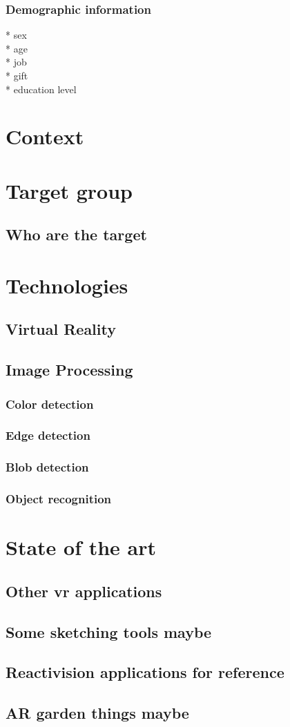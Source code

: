 		\subsubsection{Demographic information}
		* sex\\
		* age\\
		* job\\
		* gift\\
		* education level\\
		
		

	\section{Context}
		
	\section{Target group}\label{sec:targetGroup}
		\subsection{Who are the target }
	\section{Technologies}\label{sec:technologies}
		\subsection{Virtual Reality}
		\subsection{Image Processing}
			\subsubsection{Color detection}
			\subsubsection{Edge detection}
			\subsubsection{Blob detection}
			\subsubsection{Object recognition}

    \section{State of the art}\label{sec:SOTA}
		\subsection{Other vr applications}
		
\subsection{Some sketching tools maybe}
		\subsection{Reactivision applications for reference}
		\subsection{AR garden things maybe}